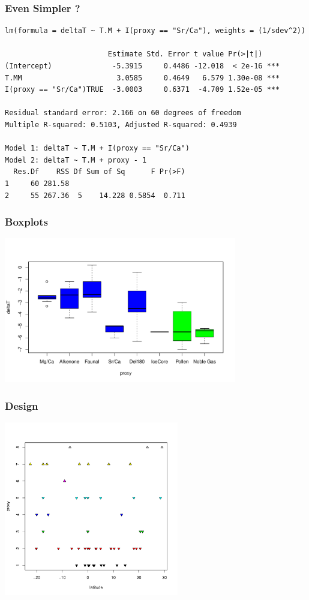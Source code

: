 \documentclass[]{beamer}
\begin{document}
\begin{frame}[fragile]
  \frametitle{Even Simpler ?}
  \begin{small}
\begin{verbatim}
lm(formula = deltaT ~ T.M + I(proxy == "Sr/Ca"), weights = (1/sdev^2))

                        Estimate Std. Error t value Pr(>|t|)    
(Intercept)              -5.3915     0.4486 -12.018  < 2e-16 ***
T.MM                      3.0585     0.4649   6.579 1.30e-08 ***
I(proxy == "Sr/Ca")TRUE  -3.0003     0.6371  -4.709 1.52e-05 ***

Residual standard error: 2.166 on 60 degrees of freedom
Multiple R-squared: 0.5103,	Adjusted R-squared: 0.4939 

Model 1: deltaT ~ T.M + I(proxy == "Sr/Ca") 
Model 2: deltaT ~ T.M + proxy - 1
  Res.Df    RSS Df Sum of Sq      F Pr(>F)
1     60 281.58                           
2     55 267.36  5    14.228 0.5854  0.711
\end{verbatim}
\end{small}
\end{frame}
\begin{frame}
  \frametitle{Boxplots}
\centerline{ \includegraphics[height=2.5in]{box}}
\end{frame}
\begin{frame}
  \frametitle{Design}
  \centerline{\includegraphics[height=3in]{lat-proxy}}
\end{frame}
\end{document}
